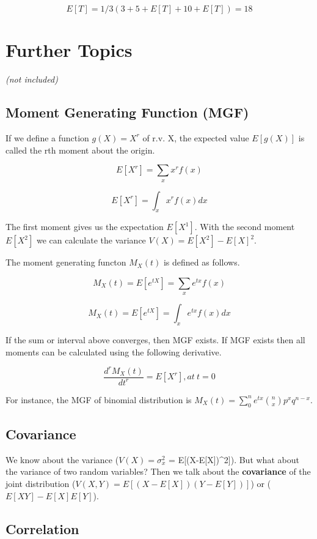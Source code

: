 \documentclass[]{book}
\theoremstyle{definition}
\theoremstyle{definition}
\theoremstyle{definition}
\theoremstyle{remark}
\begin{document}
\[E[T] = 1/3 (3 + 5 + E[T] + 10 + E[T]) = 18\]

\hypertarget{further-topics}{%
\chapter{Further Topics}\label{further-topics}}

\emph{(not included)}

\hypertarget{moment-generating-function-mgf}{%
\section{Moment Generating Function
(MGF)}\label{moment-generating-function-mgf}}

If we define a function \(g(X)=X^r\) of r.v. X, the expected value
\(E[g(X)]\) is called the rth moment about the origin.

\[E[X^r] = \sum_x x^r f(x)\]

\[E[X^r] = \int_x x^r f(x) dx\]

The first moment gives us the expectation \(E[X^1]\). With the second
moment \(E[X^2]\) we can calculate the variance
\(V(X) = E[X^2] - E[X]^2\).

The moment generating functon \(M_X(t)\) is defined as follows.

\[M_X(t) = E[e^{tX}] = \sum_x e^{tx} f(x)\]

\[M_X(t) = E[e^{tX}] = \int_x e^{tx} f(x) dx\]

If the sum or interval above converges, then MGF exists. If MGF exists
then all moments can be calculated using the following derivative.

\[\dfrac{d^rM_X(t)}{dt^r} = E[X^r], at\ t=0\]

For instance, the MGF of binomial distribution is
\(M_X(t) = \sum_0^n e^{tx} \binom{n}{x}p^xq^{n-x}\).

\hypertarget{covariance}{%
\section{Covariance}\label{covariance}}

We know about the variance (\(V(X) = \sigma_x^2\) =
E{[}(X-E{[}X{]})\^{}2{]}). But what about the variance of two random
variables? Then we talk about the \textbf{covariance} of the joint
distribution (\(V(X,Y) = E[(X-E[X])(Y-E[Y])]\)) or
(\(E[XY] - E[X]E[Y]\)).

\hypertarget{correlation}{%
\section{Correlation}\label{correlation}}
\end{document}
